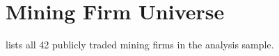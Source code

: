 \documentclass[12pt]{article}
\begin{document}
\label{apep_main_text_end}

\clearpage



\clearpage
\appendix

\section{Mining Firm Universe}\label{app:firms}

 lists all 42 publicly traded mining firms in the analysis sample.
\end{document}

